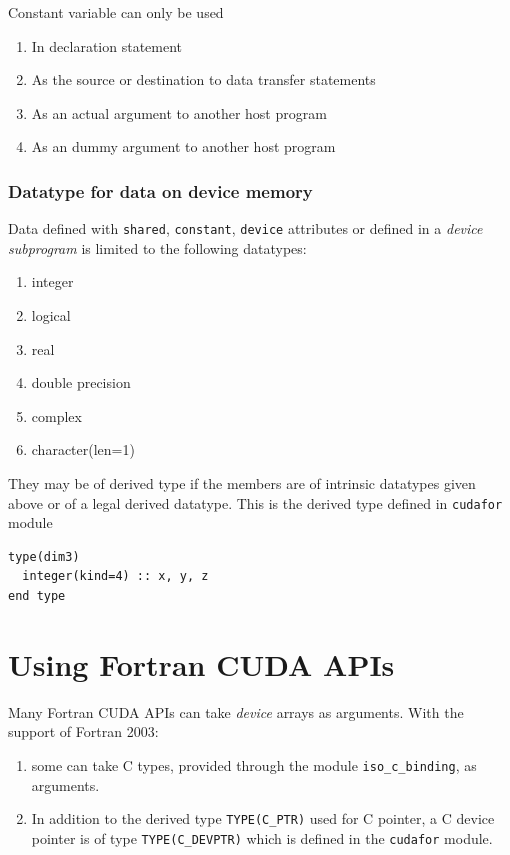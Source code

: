 Constant variable can only be used
\begin{enumerate}
\item In declaration statement
\item As the source or destination to data transfer statements
\item As an actual argument to another host program
\item As an dummy  argument to another host program
\end{enumerate}


\subsubsection{Datatype for data on device memory}
\label{sec:datatype-data-device}

Data defined with \verb!shared!, \verb!constant!, \verb!device!
attributes or defined in a {\it device subprogram} is limited to the
following datatypes:
\begin{enumerate}
\item integer 
\item logical
\item real
\item double precision
\item complex
\item character(len=1)
\end{enumerate}

They may be of derived type if the members are of intrinsic datatypes
given above or of a legal derived datatype. This is the derived type
defined in \verb!cudafor! module
\begin{lstlisting}
type(dim3)
  integer(kind=4) :: x, y, z
end type
\end{lstlisting}



\section{Using Fortran CUDA APIs}
\label{sec:using-fortran-cuda}

Many Fortran CUDA APIs can take {\it device} arrays as arguments.
With the support of Fortran 2003:
\begin{enumerate}
\item some can take C types, provided through the module
  \verb!iso_c_binding!, as arguments.

\item In addition to the derived type \verb!TYPE(C_PTR)! used for C
  pointer, a C device pointer is of type \verb!TYPE(C_DEVPTR)! which
  is defined in the \verb!cudafor!  module.
\end{enumerate}

